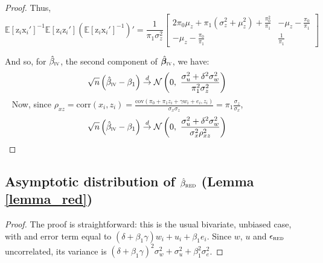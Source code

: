 \documentclass[usletter, 12pt]{article}
\begin{document}
\begin{proof}
		Thus, 
			\[
				     \mathbb{E}[\text{z}_{i}\text{x}_i']^{-1}\mathbb{E}[\text{z}_{i}\text{z}_i']  \left( \mathbb{E}[\text{z}_{i}\text{x}_i']^{-1} \right)' 
				     		= \dfrac{1}{\pi_1 \sigma_{z}^{2}} 
				     			\begin{bmatrix}
								2 \pi_0 \mu_z + \pi_1(\sigma_{z}^{2} + \mu_{z}^{2}) + \frac{\pi_0^2}{\pi_1}&   -\mu_{z} -  \frac{\pi_0}{\pi_1} \\ 
								  -\mu_{z} -  \frac{\pi_0}{\pi_1} & \frac{1}{\pi_1}
							\end{bmatrix} 
			\]
			
			And so, for $\hat{\beta}_{\textsc{iv}}$, the second component of $\hat{\bm{\beta}}_{\textsc{iv}}$, we have:
				\begin{equation}
					\sqrt{n}\left( \hat{\beta}_{\textsc{iv}} - \beta_{1} \right)
					\overset{d}{\to}
					\mathcal{N}\left( 0 , \ \dfrac{\sigma_{u}^{2} + \delta^{2}\sigma_{w}^{2}}{\pi_{1}^{2}\sigma_{z}^{2}} \right) 
				\end{equation}
				~
				Now, since $ \rho_{xz} = \text{corr}(x_{i}, z_{i}) =  \frac{\text{cov}( \pi_0 + \pi_1 z_i + \gamma w_{i} + e_{i} , z_i)}{\sigma_x \sigma_z} = \pi_1 \frac{\sigma_z}{\sigma_x}$,
				~
				\[
						\sqrt{n}\left( \hat{\beta}_{\textsc{iv}} - \beta_{1} \right)
						\overset{d}{\to}
							 \mathcal{N}\left( 0 , \ \dfrac{\sigma_{u}^{2} + \delta^{2}\sigma_{w}^{2}}{\sigma_{x}^{2} \rho_{xz}^{2}} \right) 
				\]
				\vspace{-0.5cm}
			\end{proof}
				


\subsection{Asymptotic distribution of $\hat{\beta}_{\textsc{red}}$ (Lemma \ref{lemma_red})}
				
			\begin{proof}
				The proof is straightforward: this is the usual bivariate, unbiased case, with and error term equal to $(\delta + \beta_{1}\gamma) w_{i} + u_{i} + \beta_{1}e_{i}$. Since $w$, $u$ and $\epsilon_{\textsc{red}}$ uncorrelated, its variance is $(\delta + \beta_{1}\gamma)^{2} \sigma_{w}^{2} + \sigma_{u}^{2} + \beta_{1}^{2}\sigma_{e}^{2}$.
			\end{proof}
			
			
			
\end{document}

